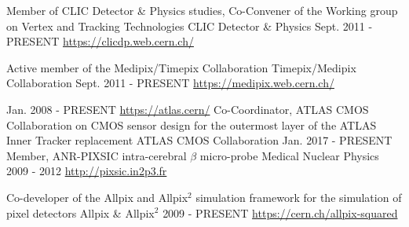 


\begin{cventries}

  \cventry
    {Member of CLIC Detector \& Physics studies, Co-Convener of the Working group on Vertex and Tracking Technologies} %
    {CLIC Detector \& Physics} %
    {} %
    {Sept. 2011 - PRESENT} %
    {\url{https://clicdp.web.cern.ch/}\newline}
    
  \cventry 
    {Active member of the Medipix/Timepix Collaboration}
    {Timepix/Medipix Collaboration}
    {}
    {Sept. 2011 - PRESENT} %
    {\url{https://medipix.web.cern.ch/}\newline}
    
    {}  
    {Jan. 2008 - PRESENT}
    {\url{https://atlas.cern/} \newline}
  \cventry 
    {Co-Coordinator, ATLAS CMOS Collaboration on CMOS sensor design for the outermost layer of the ATLAS Inner Tracker replacement}
    {ATLAS CMOS Collaboration}
    {}
    {Jan. 2017 - PRESENT} %
    {}
   \cventry 
    {Member, ANR-PIXSIC intra-cerebral $\beta$ micro-probe}
    {Medical Nuclear Physics}
    {}
    {2009 - 2012} %
    {\url{http://pixsic.in2p3.fr }\newline}    
   
   \cventry 
    {Co-developer of the Allpix and Allpix$^2$ simulation framework for the simulation of pixel detectors}
    {Allpix \& Allpix$^2$}
    {}
    {2009 - PRESENT} %
    {\url{https://cern.ch/allpix-squared}}      
    

\end{cventries}

